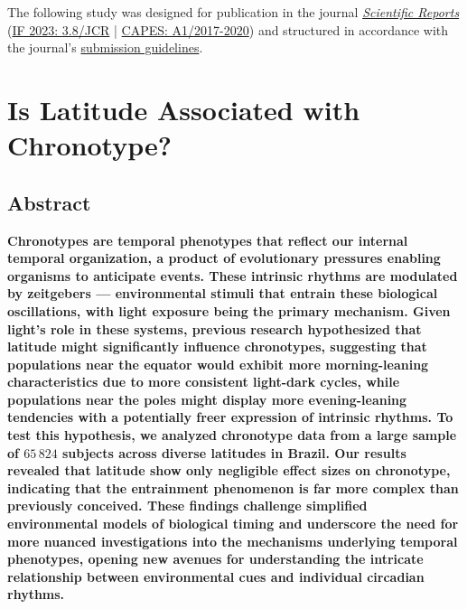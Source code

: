 \documentclass[
12pt,
openright,
oneside,
a4paper,
chapter=TITLE,
section=TITLE,
french,
spanish,
brazil,
english
]{abntex2}
\newlength{\hugeskipamount}
\begin{document}
\newpage

\null\vfill

\begingroup
{}
\noindent The following study was designed for publication in the journal \href{https://www.nature.com/srep/}{\textit{Scientific Reports}} (\href{https://jcr.clarivate.com/jcr}{IF 2023: 3.8/JCR} | \href{https://sucupira-legado.capes.gov.br/sucupira/}{CAPES: A1/2017-2020}) and structured in accordance with the journal's \href{https://www.nature.com/srep/author-instructions/submission-guidelines}{submission guidelines}.
\endgroup

\vspace{\hugeskipamount}


\chapter{Is Latitude Associated with
Chronotype?}\label{is-latitude-associated-with-chronotype}

\section{Abstract}\label{abstract}

\noindent \textbf{Chronotypes are temporal phenotypes that reflect our
internal temporal organization, a product of evolutionary pressures
enabling organisms to anticipate events. These intrinsic rhythms are
modulated by zeitgebers --- environmental stimuli that entrain these
biological oscillations, with light exposure being the primary
mechanism. Given light's role in these systems, previous research
hypothesized that latitude might significantly influence chronotypes,
suggesting that populations near the equator would exhibit more
morning-leaning characteristics due to more consistent light-dark
cycles, while populations near the poles might display more
evening-leaning tendencies with a potentially freer expression of
intrinsic rhythms. To test this hypothesis, we analyzed chronotype data
from a large sample of \(65\,824\) subjects across diverse latitudes in
Brazil. Our results revealed that latitude show only negligible effect
sizes on chronotype, indicating that the entrainment phenomenon is far
more complex than previously conceived. These findings challenge
simplified environmental models of biological timing and underscore the
need for more nuanced investigations into the mechanisms underlying
temporal phenotypes, opening new avenues for understanding the intricate
relationship between environmental cues and individual circadian
rhythms.}
\end{document}

